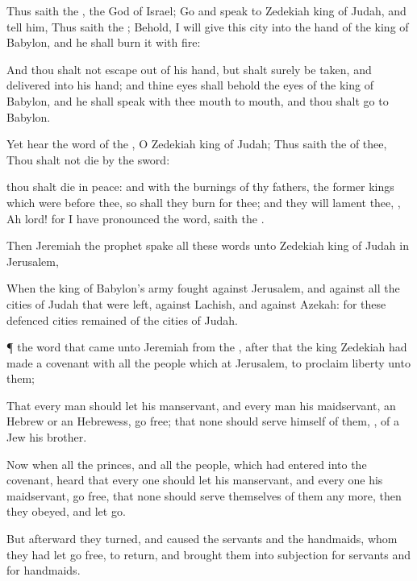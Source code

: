 {Thus
saith the
{}, the
God of
Israel;
Go and
speak to
Zedekiah
king of
Judah, and
tell him, Thus
saith the
{}; Behold, I will
give this
city into the
hand of the
king of
Babylon, and he shall
burn it with
fire:

And thou shalt not escape
out of his
hand, but shalt
surely be
taken, and
delivered into his
hand; and thine
eyes shall
behold the
eyes of the
king of
Babylon, and he shall
speak with thee
mouth to
mouth, and thou shalt
go to
Babylon.

Yet
hear the
word of the
{}, O
Zedekiah
king of
Judah; Thus
saith the
{} of thee, Thou shalt not
die by the
sword:

 thou shalt
die in
peace: and with the
burnings of thy
fathers, the
former
kings which were
before thee, so shall they
burn
{} for thee; and they will
lament thee,
{},
Ah
lord! for I have
pronounced the
word,
saith the
{}.

Then
Jeremiah the
prophet
spake all these
words unto
Zedekiah
king of
Judah in
Jerusalem,

When the
king of
Babylon’s
army
fought against
Jerusalem, and against all the
cities of
Judah that were
left, against
Lachish, and against
Azekah: for these
defenced
cities
remained of the
cities of
Judah.


\par }{\PP {}¶
{} the
word that came unto
Jeremiah from the
{},
after that the
king
Zedekiah had
made a
covenant with all the
people which
{} at
Jerusalem, to
proclaim
liberty unto them;

That every
man should let his
manservant, and every
man his
maidservant,
{} an
Hebrew or an
Hebrewess,
go
free; that none should
serve himself of them,
{}, of a
Jew his
brother.

Now when all the
princes, and all the
people, which had
entered into the
covenant,
heard that every
one should let his
manservant, and every
one his
maidservant,
go
free, that none should
serve themselves of them any more, then they
obeyed, and let
{}
go.

But
afterward they
turned, and caused the
servants and the
handmaids, whom they had let
go
free, to
return, and brought them into
subjection for
servants and for
handmaids.


}
